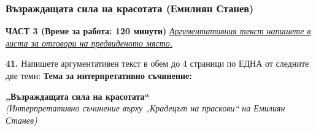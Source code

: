 \documentclass[12pt,a4paper]{article}
\begin{document}
\subsubsection{Възраждащата сила на красотата (Емилиян Станев)}
\vspace{0.5cm}
\begin{center}
\textbf{ЧАСТ 3 (Време за работа: 120 минути)}
\vspace{0.2cm}
{\textit{\underline{Аргументативния текст напишете в листа за отговори на предвиденото място.}}}
\vspace{0.1cm}
\end{center}
\textbf{41.} Напишете аргументативен текст в обем до 4 страници по ЕДНА от следните две теми:
\vspace{0.2cm}
\textbf{Тема за интерпретативно съчинение:}
\vspace{0.1cm}
\begin{center}
\textbf{„Възраждащата сила на красотата“}
\\
\textit{(Интерпретативно съчинение върху „Крадецът на праскови“ на Емилиян Станев)}
\end{center}
\end{document}
